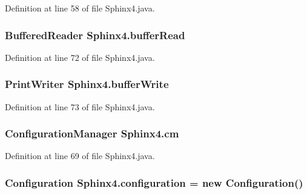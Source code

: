Definition at line 58 of file Sphinx4.\-java.

\hypertarget{classSphinx4_a60e71ecb19da1d08a0c2d71b0f6ac875}{
\subsubsection[{buffer\-Read}]{\setlength{\rightskip}{0pt plus 5cm}Buffered\-Reader Sphinx4.\-buffer\-Read\hspace{0.3cm}{\ttfamily [static]}}}\label{classSphinx4_a60e71ecb19da1d08a0c2d71b0f6ac875}


Definition at line 72 of file Sphinx4.\-java.

\hypertarget{classSphinx4_aa3a9b95c9245e791f4d8e04b157372ca}{
\subsubsection[{buffer\-Write}]{\setlength{\rightskip}{0pt plus 5cm}Print\-Writer Sphinx4.\-buffer\-Write\hspace{0.3cm}{\ttfamily [static]}}}\label{classSphinx4_aa3a9b95c9245e791f4d8e04b157372ca}


Definition at line 73 of file Sphinx4.\-java.

\hypertarget{classSphinx4_a227104f3b942fde3f279ee54a700772d}{
\subsubsection[{cm}]{\setlength{\rightskip}{0pt plus 5cm}Configuration\-Manager Sphinx4.\-cm\hspace{0.3cm}{\ttfamily [static]}}}\label{classSphinx4_a227104f3b942fde3f279ee54a700772d}


Definition at line 69 of file Sphinx4.\-java.

\hypertarget{classSphinx4_adad3fb0b68649c440cabe47895a53e27}{
\subsubsection[{configuration}]{\setlength{\rightskip}{0pt plus 5cm}Configuration Sphinx4.\-configuration = new Configuration()\hspace{0.3cm}{\ttfamily [static]}}}\label{classSphinx4_adad3fb0b68649c440cabe47895a53e27}


